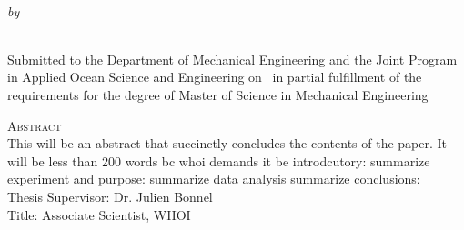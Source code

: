 \begin{center}
{\large \@title} \\
\emph{\footnotesize by} \\
\@author \\
\end{center}

\vspace{-1em}

\begin{center}
\begin{singlespace}
{\parindent0pt
\small
Submitted to the Department of Mechanical Engineering and the Joint Program in Applied Ocean Science and Engineering on \@date ~in partial fulfillment of the requirements for the degree of Master of Science in Mechanical Engineering}
\end{singlespace}
\end{center}

\begin{singlespace}
{\parindent0pt 
	{\large \textsc{Abstract}} \\ %
    This will be an abstract that succinctly concludes the contents of the paper. It will be less than 200 words bc whoi demands it be 
    introdcutory:
    summarize experiment and purpose:
    summarize data analysis
    summarize conclusions:
    \\
    
	\noindent Thesis Supervisor: Dr. Julien Bonnel \\
	\noindent Title: Associate Scientist, WHOI \\
}
\end{singlespace}

\newpage
\null
\thispagestyle{empty}
\newpage